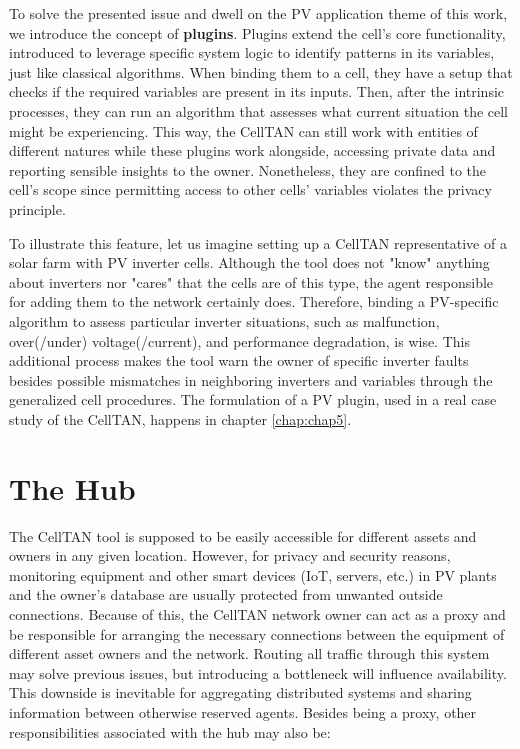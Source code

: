 To solve the presented issue and dwell on the PV application theme of this work, we introduce the concept of \textbf{plugins}. Plugins extend the cell's core functionality, introduced to leverage specific system logic to identify patterns in its variables, just like classical algorithms. When binding them to a cell, they have a setup that checks if the required variables are present in its inputs. Then, after the intrinsic processes, they can run an algorithm that assesses what current situation the cell might be experiencing. This way, the CellTAN can still work with entities of different natures while these plugins work alongside, accessing private data and reporting sensible insights to the owner. Nonetheless, they are confined to the cell's scope since permitting access to other cells' variables violates the privacy principle.

To illustrate this feature, let us imagine setting up a CellTAN representative of a solar farm with PV inverter cells. Although the tool does not "know" anything about inverters nor "cares" that the cells are of this type, the agent responsible for adding them to the network certainly does. Therefore, binding a PV-specific algorithm to assess particular inverter situations, such as malfunction, over(/under) voltage(/current), and performance degradation, is wise. This additional process makes the tool warn the owner of specific inverter faults besides possible mismatches in neighboring inverters and variables through the generalized cell procedures. The formulation of a PV plugin, used in a real case study of the CellTAN, happens in chapter \ref{chap:chap5}.

\section{The Hub}

The CellTAN tool is supposed to be easily accessible for different assets and owners in any given location. However, for privacy and security reasons, monitoring equipment and other smart devices (IoT, servers, etc.) in PV plants and the owner's database are usually protected from unwanted outside connections. Because of this, the CellTAN network owner can act as a proxy and be responsible for arranging the necessary connections between the equipment of different asset owners and the network. Routing all traffic through this system may solve previous issues, but introducing a bottleneck will influence availability. This downside is inevitable for aggregating distributed systems and sharing information between otherwise reserved agents. Besides being a proxy, other responsibilities associated with the hub may also be:

